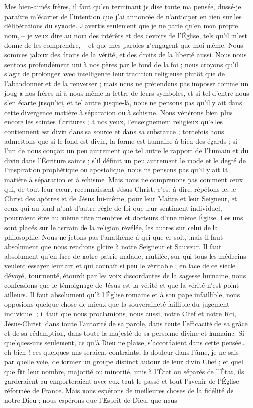 Mes bien-aimés frères, il faut qu’en terminant je dise toute ma pensée, dussé-je paraître m’écarter de l’intention que j’ai annoncée de n’anticiper en rien sur les délibérations du synode. J’avertis seulement que je ne parle qu’en mon propre nom, – je veux dire au nom des intérêts et des devoirs de l’Église, tels qu’il m’est donné de les comprendre, – et que mes paroles n’engagent que moi-même. Nous sommes jaloux des droits de la vérité, et des droits de la liberté aussi. Nous nous sentons profondément uni à nos pères par le fond de la foi ; nous croyons qu’il s’agit de prolonger avec intelligence leur tradition religieuse plutôt que de l’abandonner et de la renverser ; mais nous ne prétendons pas imposer comme un joug à nos frères ni à nous-même la lettre de leurs symboles, et si tel d’entre nous s’en écarte jusqu’ici, et tel autre jusque-là, nous ne pensons pas qu’il y ait dans cette divergence matière à séparation ou à schisme. Nous vénérons bien plus encore les saintes Écritures ; à nos yeux, l’enseignement religieux qu’elles contiennent est divin dans sa source et dans sa substance ; toutefois nous admettons que si le fond est divin, la forme est humaine à bien des égards ; si l’un de nous conçoit un peu autrement que tel autre le rapport de l’humain et du divin dans l’Écriture sainte ; s’il définit un peu autrement le mode et le degré de l’inspiration prophétique ou apostolique, nous ne pensons pas qu’il y ait là matière à séparation et à schisme. Mais nous ne comprenons pas comment ceux qui, de tout leur cœur, reconnaissent Jésus-Christ, c’est-à-dire, répétons-le, le Christ des apôtres et de Jésus lui-même, pour leur Maître et leur Seigneur, et ceux qui au fond n’ont d’autre règle de foi que leur sentiment individuel, pourraient être au même titre membres et docteurs d’une même Église. Les uns sont placés sur le terrain de la religion révélée, les autres sur celui de la philosophie. Nous ne jetons pas l’anathème à qui que ce soit, mais il faut absolument que nous rendions gloire à notre Seigneur et Sauveur. Il faut absolument qu’en face de notre patrie malade, mutilée, sur qui tous les médecins veulent essayer leur art et qui connaît si peu le véritable ; en face de ce siècle dévoyé, tourmenté, étourdi par les voix discordantes de la sagesse humaine, nous confessions que le témoignage de Jésus est la vérité et que la vérité n’est point ailleurs. Il faut absolument qu’à l’Église romaine et à son pape infaillible, nous opposions quelque chose de mieux que la souveraineté faillible du jugement individuel ; il faut que nous proclamions, nous aussi, notre Chef et notre Roi, Jésus-Christ, dans toute l’autorité de sa parole, dans toute l’efficacité de sa grâce et de sa rédemption, dans toute la majesté de sa personne divine et humaine. Si quelques-uns seulement, ce qu’à Dieu ne plaise, s’accordaient dans cette pensée… eh bien ! ces quelques-uns seraient contraints, la douleur dans l’âme, je ne sais par quelle voie, de former un groupe distinct autour de leur divin Chef ; et quel que fût leur nombre, majorité ou minorité, unis à l’État ou séparés de l’État, ils garderaient ou emporteraient avec eux tout le passé et tout l’avenir de l’Église réformée de France. Mais nous espérons de meilleures choses de la fidélité de notre Dieu ; nous espérons que l’Esprit de Dieu, que nous 